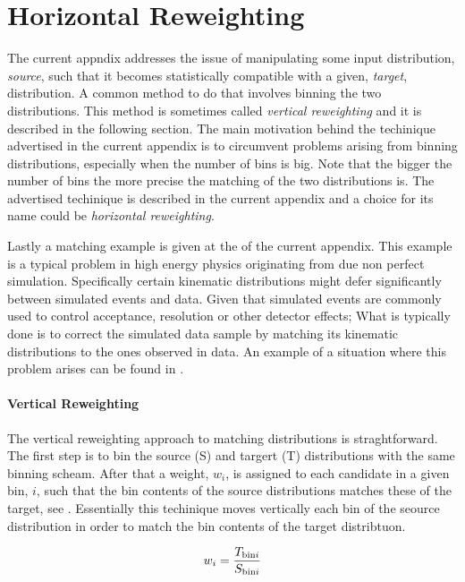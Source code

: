 
\chapter{Horizontal Reweighting}
\label{AppendixB}

The current appndix addresses the issue of manipulating some input distribution, {\it source}, such that
it becomes statistically compatible with a given, {\it target}, distribution. A common method to do that
involves binning the two distributions. This method is sometimes called {\it vertical reweighting}
and it is described in the following section. The main motivation behind the techinique advertised in the current
appendix is to circumvent problems arising from binning distributions, especially when the number of
bins is big. Note that the bigger the number of bins the more precise the matching of the two distributions
is. The advertised techinique is described in the current appendix and a choice for its name could be {\it horizontal reweighting}.

Lastly a matching example is given at the of the current appendix. This example is a typical problem
in high energy physics originating from due non perfect simulation. Specifically certain kinematic
distributions might defer significantly between simulated events and data. Given that simulated
events are commonly used to control acceptance, resolution or other detector effects; What is typically
done is to correct the simulated data sample by matching its kinematic distributions to the ones observed in data.
An example of a situation where this problem arises can be found in .

\subsubsection{Vertical Reweighting}
The vertical reweighting approach to matching distributions is straghtforward.
The first step is to bin the source (S) and targert (T) distributions with the same binning scheam.
After that a weight, $w_i$, is assigned to each candidate in a given bin, $i$, such that the bin
contents of the source distributions matches these of the target, see .
Essentially this techinique moves vertically each bin of the seource distribution in order to match
the bin contents of the target distribtuon.

\begin{equation}
  \centering
  w_i = \frac{T_{{\rm bin}i}}{S_{{\rm bin}i}}
\label{vert_rew}
\end{equation}

